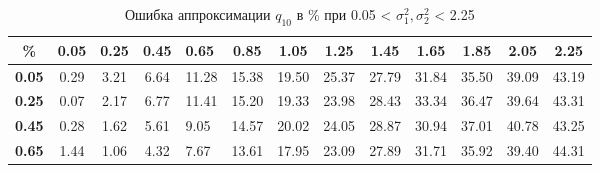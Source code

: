 \documentclass[12pt]{article}
\begin{document}
\begin{table}[!hhh]
	\caption{Ошибка аппроксимации $q_{10}$ в \% при 0.05 < $\sigma_{1}^{2}, \sigma_{2}^{2}$ < 2.25 }
	\label{tab2}
	\begin{tabular}{|c|ccclcccccccc}
		\hline
		\textbf{\%}                         & \multicolumn{1}{c|}{\textbf{0.05}} & \multicolumn{1}{c|}{\textbf{0.25}} & \multicolumn{1}{c|}{\textbf{0.45}} & \multicolumn{1}{l|}{\textbf{0.65}} & \multicolumn{1}{c|}{\textbf{0.85}} & \multicolumn{1}{c|}{\textbf{1.05}} & \multicolumn{1}{c|}{\textbf{1.25}} & \multicolumn{1}{c|}{\textbf{1.45}} & \multicolumn{1}{c|}{\textbf{1.65}} & \multicolumn{1}{c|}{\textbf{1.85}} & \multicolumn{1}{c|}{\textbf{2.05}} & \multicolumn{1}{c|}{\textbf{2.25}} \\ \hline
		\textbf{0.05}                       & 0.29                               & 3.21                               & 6.64                               & \multicolumn{1}{c}{11.28}          & 15.38                              & 19.50                              & 25.37                              & 27.79                              & 31.84                              & 35.50                              & 39.09                              & 43.19                              \\ \cline{1-1}
		\textbf{0.25}                       & 0.07                               & 2.17                               & 6.77                               & 11.41                              & 15.20                              & 19.33                              & 23.98                              & 28.43                              & 33.34                              & 36.47                              & 39.64                              & 43.31                              \\ \cline{1-1}
		\textbf{0.45}                       & 0.28                               & 1.62                               & 5.61                               & 9.05                               & 14.57                              & 20.02                              & 24.05                              & 28.87                              & 30.94                              & 37.01                              & 40.78                              & 43.25                              \\ \cline{1-1}
		\textbf{0.65}                       & 1.44                               & 1.06                               & 4.32                               & 7.67                               & 13.61                              & 17.95                              & 23.09                              & 27.89                              & 31.71                              & 35.92                              & 39.40                              & 44.31                              \\ \cline{1-1}

\end{tabular}
\end{table}
\end{document}
